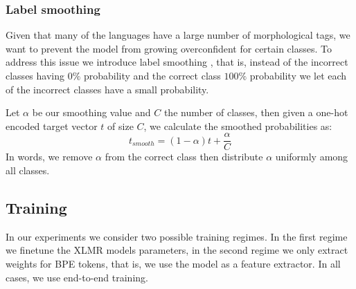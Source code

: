 \documentclass[11pt]{article}
\newcommand\jp[1]{(\textbf{JP:} #1)}
\begin{document}
	
	\subsubsection{Label smoothing}
    	Given that many of the languages have a large number of
     morphological tags, we want to prevent the model from growing
     overconfident for certain classes. To address this issue we
     introduce label smoothing \cite{szegedy2016rethinking}, that is,
     instead of the incorrect classes having $0\%$ probability and the
     correct class $100\%$ probability we let each of the incorrect
     classes have a small probability.


     Let $\alpha$ be our smoothing value and $C$ the number of
     classes, then given a one-hot encoded target vector $t$ of size
     $C$, we calculate the smoothed probabilities as:
    \begin{equation}
        t_{smooth} = (1-\alpha)t + \frac{\alpha}{C}
    \end{equation}
    In words, we remove $\alpha$ from the correct class then
    distribute $\alpha$ uniformly among all classes.

     \subsection{Training}

	
     In our experiments we consider two possible training regimes. In
     the first regime we finetune the XLMR models parameters, in the
     second regime we only extract weights for BPE tokens, that is, we
     use the model as a feature extractor. In all cases, we use
     end-to-end training.
     
\end{document}
